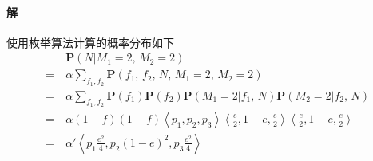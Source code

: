 \documentclass{article}
\begin{document}
\paragraph{解}
使用枚举算法计算的概率分布如下
\begin{align*}
        & \mathbf{P}(N | M_1 = 2,\, M_2 = 2)                                                                                                                                            \\
    =\  & \alpha \sum_{f_1, f_2}\mathbf{P}(f_1,\, f_2,\, N,\, M_1 = 2,\, M_2 = 2)                                                                                                       \\
    =\  & \alpha \sum_{f_1,f_2}\mathbf{P}(f_1)\mathbf{P}(f_2)\mathbf{P}(M_1 = 2 | f_1,\, N)\mathbf{P}(M_2 = 2 | f_2,\, N)                                                               \\
    =\  & \alpha(1 - f)(1 - f)\left\langle p_1, p_2, p_3\right\rangle\left\langle \frac{e}{2}, 1 - e, \frac{e}{2}\right\rangle\left\langle \frac{e}{2}, 1 - e, \frac{e}{2}\right\rangle \\
    =\  & \alpha'\left\langle p_1\frac{e^2}{4}, p_2(1 - e)^2, p_3\frac{e^2}{4}\right\rangle
\end{align*}
\end{document}
